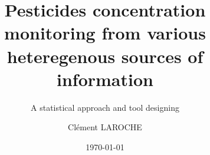 \usepackage{apacite}
\usepackage{natbib}
\usepackage{bibentry}
\makeatletter 
 \renewcommand\BR@b@bibitem[2][]{\BR@bibitem[#1]{#2}\BR@c@bibitem{#2}}           
 \makeatother
\nobibliography*
\usepackage[utf8]{inputenc}
\usepackage[a4paper, width=170mm,top=25mm,bottom=15mm]{geometry}
\usepackage{graphicx}    
\graphicspath{{figs/}} 
\usepackage[toc,page]{appendix}
\usepackage{todonotes}
\usepackage{float}
\usepackage{caption}
\usepackage{subcaption}  
\usepackage{amsmath}  
\usepackage{amsthm}  
\usepackage{amsfonts}
\usepackage{amssymb}   
\usepackage{amsthm}
\usepackage{thmtools}
\usepackage{indentfirst} 
\usepackage{url}
\usepackage{hyperref}
\usepackage{algorithm, algpseudocode}
\usepackage{algorithmicx, mathtools}
\usepackage{wrapfig}
\usepackage{breqn}
\usepackage{titlesec, color}
\usepackage{ifthen}
\usepackage{diagbox}
\usepackage{etoolbox}
\usepackage[english]{minitoc}
\usepackage{bbm, bm}
\usepackage{makeidx}
\usepackage{pdfpages}
\setcounter{minitocdepth}{4}
\newcommand{\clem}[1]{\todo[inline,color=red!20!white]{\textbf{Clement:} #1}}
\newcommand{\NN}{{\mathbb N}}
\newcommand{\PP}{{\mathbb P}}
\newcommand{\CC}{{\mathcal C}}
\newcommand{\OO}{{\mathcal O}}
\newcommand{\TT}{{\mathcal T}}
\newcommand{\maxy}{\overline{y}}
\newcommand{\maxquant}{\overline{q}}
\newcommand{\vmaxy}{\overline{Y}}

\makeindex

\title{Pesticides concentration monitoring from various heteregenous sources of information}
\subtitle{A statistical approach and tool designing}
\author{Clément LAROCHE}
\date{\today}







